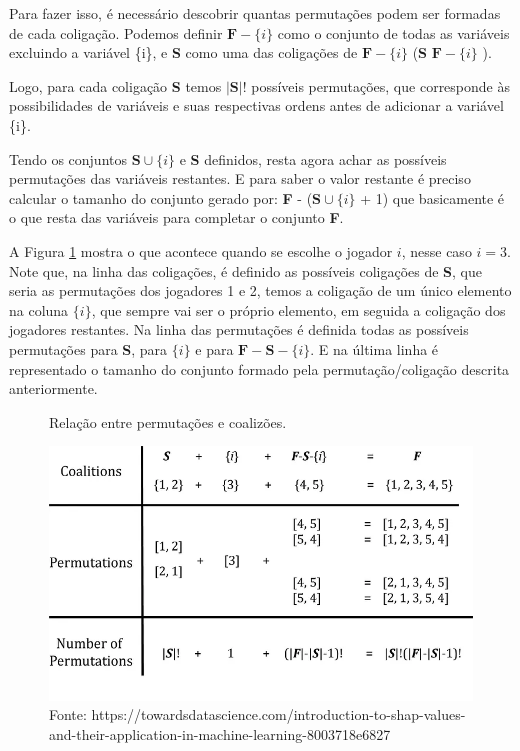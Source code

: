 Para fazer isso, é necessário descobrir quantas permutações podem ser formadas de cada coligação. Podemos definir $\textbf{F} - \{i\}$ como o conjunto de todas as variáveis excluindo a variável \{i\}, e \textbf{S} como uma das coligações de $\textbf{F} - \{i\}$ (\textbf{S} \subseteq  $\textbf{F} - \{i\}$ ).

Logo, para cada coligação \textbf{S} temos $|\textbf{S}|!$ possíveis permutações, que corresponde às possibilidades  de variáveis e suas respectivas ordens antes de adicionar a variável \{i\}.

Tendo os conjuntos $\textbf{S}\cup\{i\}$ e \textbf{S} definidos, resta agora achar as possíveis permutações das variáveis restantes. E para saber o valor restante é preciso calcular o tamanho do conjunto gerado por: \textbf{F} - ($\textbf{S}\cup\{i\}$ + 1)
que basicamente é o que resta das variáveis para completar o conjunto \textbf{F}.

A Figura \ref{fig:permut_e_colig}  mostra o que acontece quando se escolhe o jogador $i$, nesse caso $i=3$. Note que, na linha das coligações, é definido as possíveis coligações de \textbf{S}, que seria as permutações dos jogadores 1 e 2, temos a coligação de um único elemento na coluna $\{i\}$, que sempre vai ser o próprio elemento, em seguida a coligação dos jogadores restantes. Na linha das permutações é definida todas as possíveis permutações para \textbf{S}, para $\{i\}$ e para $\textbf{F}-\textbf{S}-\{i\}$. E na última linha é representado o tamanho do conjunto formado pela permutação/coligação descrita anteriormente.

\begin{figure}[H]
    \centering
    \caption{Relação entre permutações e coalizões.}
    \includegraphics[scale=0.5]{imagens/shap1.png}
    \caption*{Fonte: https://towardsdatascience.com/introduction-to-shap-values-and-their-application-in-machine-learning-8003718e6827}
    \label{fig:permut_e_colig}
    
\end{figure}


